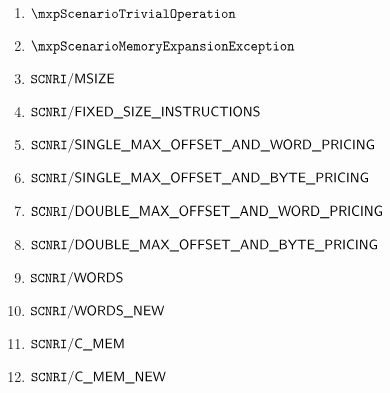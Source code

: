 \begin{enumerate}
	\item $\mxpScenarioTrivialOperation              $
	\item $\mxpScenarioMemoryExpansionException      $
	\item $\texttt{SCNRI}\textsf{/}{\textsf{MSIZE}}                         $
	\item $\texttt{SCNRI}\textsf{/}{\textsf{FIXED\_SIZE\_INSTRUCTIONS}}         $
	\item $\texttt{SCNRI}\textsf{/}{\textsf{SINGLE\_MAX\_OFFSET\_AND\_WORD\_PRICING}} $
	\item $\texttt{SCNRI}\textsf{/}{\textsf{SINGLE\_MAX\_OFFSET\_AND\_BYTE\_PRICING}} $
	\item $\texttt{SCNRI}\textsf{/}{\textsf{DOUBLE\_MAX\_OFFSET\_AND\_WORD\_PRICING}} $
	\item $\texttt{SCNRI}\textsf{/}{\textsf{DOUBLE\_MAX\_OFFSET\_AND\_BYTE\_PRICING}} $
	\item $\texttt{SCNRI}\textsf{/}{\textsf{WORDS}}                         $
	\item $\texttt{SCNRI}\textsf{/}{\textsf{WORDS\_NEW}}                      $
	\item $\texttt{SCNRI}\textsf{/}{\textsf{C\_MEM}}                          $
	\item $\texttt{SCNRI}\textsf{/}{\textsf{C\_MEM\_NEW}}                       $
\end{enumerate}

